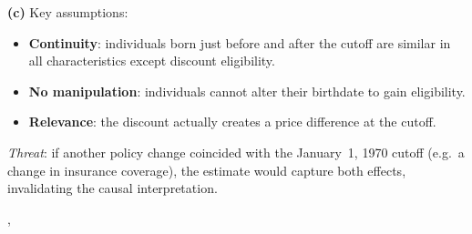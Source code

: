 {{    \textbf{(c)} Key assumptions:
    \begin{itemize}
      \item \textbf{Continuity}: individuals born just before and after the
            cutoff are similar in all characteristics except discount
            eligibility.
      \item \textbf{No manipulation}: individuals cannot alter their
            birthdate to gain eligibility.
      \item \textbf{Relevance}: the discount actually creates a price
            difference at the cutoff.
    \end{itemize}
    \textit{Threat}: if another policy change coincided with the January~1,
    1970 cutoff (e.g.\ a change in insurance coverage), the estimate would
    capture both effects, invalidating the causal interpretation.
  },
}
